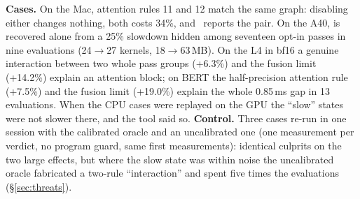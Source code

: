 \textbf{Cases.} On the Mac, attention rules 11 and 12 match the same graph: disabling either changes nothing, both
costs 34\%, and \tool\ reports the pair. On the A40,  is recovered alone from a 25\% slowdown
hidden among seventeen opt-in passes in nine evaluations (24$\to$27 kernels, 18$\to$63\,MB). On the L4 in bf16 a
genuine interaction between two whole pass groups (+6.3\%) and the fusion limit (+14.2\%) explain an attention block;
on BERT the half-precision attention rule (+7.5\%) and the fusion limit (+19.0\%) explain the whole 0.85\,ms gap in 13
evaluations. When the CPU cases were replayed on the GPU the ``slow'' states were not slower there, and the tool said so.
\textbf{Control.} Three cases re-run in one session with the calibrated oracle and an uncalibrated one (one
measurement per verdict, no program guard, same first measurements): identical culprits on the two large effects, but
where the slow state was within noise the uncalibrated oracle fabricated a two-rule ``interaction'' and spent five times
the evaluations (\S\ref{sec:threats}).
